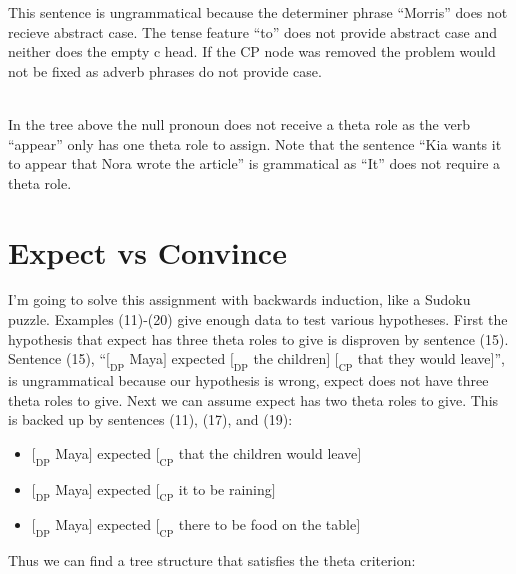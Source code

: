 \documentclass[20pt]{article}
\newcommand{\feature}[1]{\ensuremath{\left[ \text{#1} \right]}}
\newcommand{\treeScale}[0]{0.9}
\newcommand{\rolesOpacity}[0]{0.7}
\newcommand{\rolesOne}[0]{$<$$\theta$$>$}
\newcommand{\constituent}[2]{$[_{\text{#1}}$ #2$]$}
\begin{document}
This sentence is ungrammatical because the determiner phrase ``Morris'' does not
recieve abstract case. The tense feature ``to'' does not provide abstract case
and neither does the empty c head. If the CP node was removed the problem would
not be fixed as adverb phrases do not provide case. \\

 \\

In the tree above the null pronoun does not receive a theta role as
the verb ``appear'' only has one theta role to assign. Note that the sentence
``Kia wants it to appear that Nora wrote the article'' is grammatical
as ``It'' does not require a theta role.

\newpage

\section{Expect vs Convince}

I'm going to solve this assignment with backwards induction, like a Sudoku
puzzle. Examples (11)-(20) give enough data to test various hypotheses. First
the hypothesis that expect has three theta roles to give is disproven by
sentence (15). Sentence (15), ``\constituent{DP}{Maya} expected \constituent{DP}{the children}
\constituent{CP}{that they would leave}'', is ungrammatical because our
hypothesis is wrong, expect does not have three theta roles to give. Next we can
assume expect has two theta roles to give. This is backed up by sentences
(11), (17), and (19):
\begin{itemize}
\item \constituent{DP}{Maya} expected \constituent{CP}{that the children would leave}
\item \constituent{DP}{Maya} expected \constituent{CP}{it to be raining}
\item \constituent{DP}{Maya} expected \constituent{CP}{there to be food on the table}
\end{itemize}
Thus we can find a tree structure that satisfies the theta criterion: \\
\end{document}
